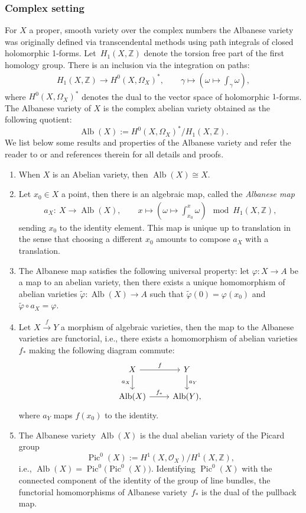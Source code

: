 \documentclass[11pt]{article}
\numberwithin{equation}{section}
\newcommand{\Pic}{\operatorname{Pic}}
\newcommand{\Alb}{\operatorname{Alb}}
\numberwithin{equation}{section}
\theoremstyle{definition}
\begin{document}
\subsubsection{Complex setting}
For $X$ a proper, smooth variety over the complex numbers the Albanese variety was originally defined via transcendental methods using path integrals of closed holomorphic 1-forms. Let~$H_1(X,\mathbb Z)$ denote the torsion free part of the first homology group. There is an inclusion via the integration on paths:
\begin{align*}
 H_1(X,\mathbb Z)\longrightarrow H^0(X,\Omega_X)^*,\qquad
 \gamma\longmapsto \left(\omega\mapsto\int_{\gamma}\omega\right),
\end{align*}
where $ H^0(X,\Omega_X)^*$ denotes the dual to the vector space of holomorphic $1$-forms.
The Albanese variety of $X$ is the complex abelian variety obtained as the following quotient:
\[\Alb(X):=H^0(X,\Omega_X)^*\slash H_1(X,\mathbb Z). \]
We list below some results and properties of the Albanese variety and refer the reader to \cite[Section~11.11]{birkenhake} or \cite{mumford1974abelian} and references therein for all details and proofs.
\begin{enumerate}\itemsep=0pt
 \item[(1)] When $X$ is an Abelian variety, then $\Alb(X)\cong X$.
 \item[(2)] Let $x_0\in X$ a point, then there is an algebraic map, called the \emph{Albanese map}
 \begin{align*}
 a_{X}\colon \ X\longrightarrow \Alb(X),\qquad
 x\longmapsto\left(\omega\mapsto\int_{x_0}^x\omega\right) \mod H_1(X,\mathbb Z),
 \end{align*}
 sending $x_0$ to the identity element. This map is unique up to translation in the sense that choosing a different $x_0$ amounts to compose $a_X$ with a translation.
 \item[(3)] The Albanese map satisfies the following universal property:
 let $\varphi\colon X\to A$ be a map to an abelian variety, then there exists a unique homomorphism of abelian varieties $\widetilde{\varphi}\colon \Alb(X)\to A $ such that $\widetilde{\varphi}(0)=\varphi(x_0)$ and $\widetilde{\varphi}\circ a_{X}=\varphi$.
 \item[(4)] Let $X\xrightarrow{f} Y$ a morphism of algebraic varieties, then the map to the Albanese varieties are functorial, i.e., there exists a homomorphism of abelian varieties $f_*$ making the following diagram commute:
 \[
 \begin{tikzcd}
 X \arrow[r,"f"] \arrow[d,"a_X"']& Y \arrow[d,"a_Y"] \\
 \Alb(X) \arrow[r,"f_*"] & \Alb(Y),
 \end{tikzcd}
\]
 where $a_Y$ maps $f(x_0)$ to the identity.
 \item[(5)] The Albanese variety $\Alb(X)$ is the dual abelian variety of the Picard group
 \[\Pic^0(X):=H^1(X,\mathcal O_X)\slash H^1(X,\mathbb Z), \]
 i.e.,
 $\Alb(X)=\Pic^0\bigl(\Pic^0(X)\bigr)$.
 Identifying $\Pic^0(X)$ with the connected component of the identity of the group of line bundles, the functorial homomorphisms of Albanese variety~$f_*$ is the dual of the pullback map.
\end{enumerate}
\end{document}
